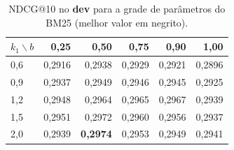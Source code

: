 \begin{table}[t]
\centering
\caption{NDCG@10 no \textbf{dev} para a grade de parâmetros do BM25 (melhor valor em negrito).}
\label{tab:dev_bm25}
\small
\begin{tabular}{lrrrrr}
\toprule
$k_1 \backslash b$ & 0,25 & 0,50 & 0,75 & 0,90 & 1,00 \\
\midrule
0,6 & 0,2916 & 0,2938 & 0,2929 & 0,2921 & 0,2896 \\
0,9 & 0,2937 & 0,2949 & 0,2946 & 0,2945 & 0,2925 \\
1,2 & 0,2948 & 0,2964 & 0,2965 & 0,2967 & 0,2939 \\
1,5 & 0,2951 & 0,2972 & 0,2960 & 0,2956 & 0,2937 \\
2,0 & 0,2939 & \textbf{0,2974} & 0,2953 & 0,2949 & 0,2941 \\
\bottomrule
\end{tabular}
\end{table}
